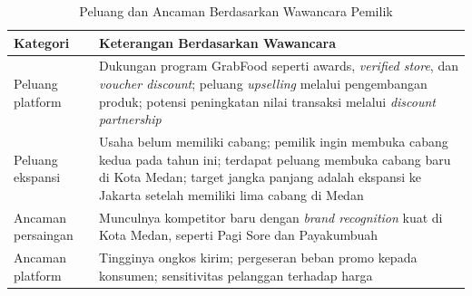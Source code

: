 \begin{table}[!htbp]
    \centering
    \caption{Peluang dan Ancaman Berdasarkan Wawancara Pemilik}
    \label{tab:peluang_ancaman_wawancara}
    \begin{tabularx}{\textwidth}{|J|Y|}
        \toprule
        \textbf{Kategori}  & \textbf{Keterangan Berdasarkan Wawancara}                                                                                                                                                                                           \\ \hline
        \midrule
        Peluang platform   & Dukungan program GrabFood seperti awards, \textit{verified store}, dan \textit{voucher discount}; peluang \textit{upselling} melalui pengembangan produk; potensi peningkatan nilai transaksi melalui \textit{discount partnership} \\ \hline
        Peluang ekspansi   & Usaha belum memiliki cabang; pemilik ingin membuka cabang kedua pada tahun ini; terdapat peluang membuka cabang baru di Kota Medan; target jangka panjang adalah ekspansi ke Jakarta setelah memiliki lima cabang di Medan          \\ \hline
        Ancaman persaingan & Munculnya kompetitor baru dengan \textit{brand recognition} kuat di Kota Medan, seperti Pagi Sore dan Payakumbuah                                                                                                                   \\ \hline
        Ancaman platform   & Tingginya ongkos kirim; pergeseran beban promo kepada konsumen; sensitivitas pelanggan terhadap harga                                                                                                                               \\ \hline
        \bottomrule
    \end{tabularx}
\end{table}

